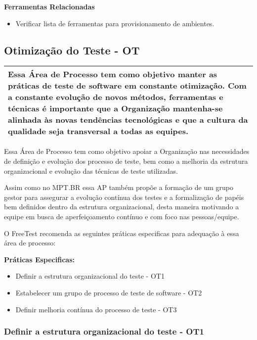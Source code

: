 \textbf{Ferramentas Relacionadas}
\begin{itemize}
    \item Verificar lista de ferramentas para provisionamento de ambientes.
\end{itemize}

\subsection{Otimização do  Teste - OT}
\label{sec:ot}

\begin{table}[H]
\centering
\begin{tabular}{|p{130mm}|}
\hline
Essa Área de Processo tem como objetivo manter as práticas de teste de software em constante otimização. Com a constante evolução de novos métodos, ferramentas e técnicas é importante que a Organização mantenha-se alinhada às novas tendências tecnológicas e que a cultura da qualidade seja transversal a todas as equipes. \\
\hline
\end{tabular}
\end{table}

Essa Área de Processo tem como objetivo apoiar a Organização nas necessidades de definição e evolução dos processo de teste, bem como a melhoria da estrutura organizacional e evolução das técnicas de teste utilizadas.

Assim como no MPT.BR \cite{GuiaMPTbr} essa AP também propõe a formação de um grupo gestor para assegurar a evolução contínua dos testes e a formalização de papéis bem definidos dentro da estrutura organizacional, desta maneira motivando a equipe em busca de aperfeiçoamento contínuo e com foco nas pessoas/equipe.


O FreeTest recomenda as seguintes práticas especificas para adequação à essa área de processo:

\textbf{Práticas Especificas:}

\begin{itemize}    
    \item Definir a estrutura organizacional do teste - OT1
    \item Estabelecer um grupo de processo de teste de software - OT2
    \item Definir melhoria contínua do processo de teste - OT3
\end{itemize}

\subsubsection{Definir a estrutura organizacional do teste - OT1}
\label{sec:tca1}

